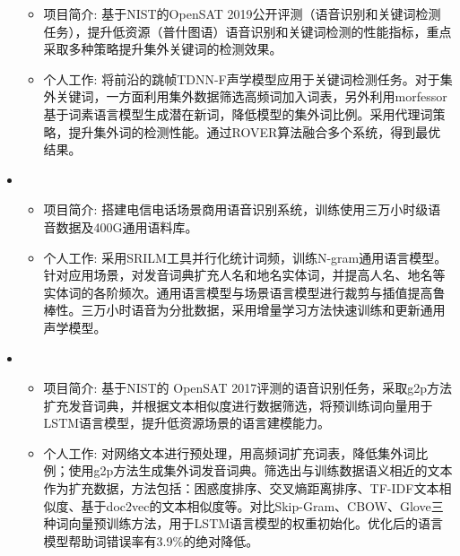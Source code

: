 \begin{itemize}[leftmargin=*]
{\begin{itemize}
        \item 项目简介: 基于NIST的OpenSAT 2019公开评测（语音识别和关键词检测任务），提升低资源（普什图语）语音识别和关键词检测的性能指标，重点采取多种策略提升集外关键词的检测效果。
        \item 个人工作:
        将前沿的跳帧TDNN-F声学模型应用于关键词检测任务。对于集外关键词，一方面利用集外数据筛选高频词加入词表，另外利用morfessor基于词素语言模型生成潜在新词，降低模型的集外词比例。采用代理词策略，提升集外词的检测性能。通过ROVER算法融合多个系统，得到最优结果。
      \end{itemize}
      }
    \item {}
     {\small
      \begin{itemize}
        \item 项目简介: 搭建电信电话场景商用语音识别系统，训练使用三万小时级语音数据及400G通用语料库。
        \item 个人工作:
        采用SRILM工具并行化统计词频，训练N-gram通用语言模型。针对应用场景，对发音词典扩充人名和地名实体词，并提高人名、地名等实体词的各阶频次。通用语言模型与场景语言模型进行裁剪与插值提高鲁棒性。三万小时语音为分批数据，采用增量学习方法快速训练和更新通用声学模型。
      \end{itemize}
      }
    \item {}
      {\small
      \begin{itemize}
        \item 项目简介: 基于NIST的 OpenSAT 2017评测的语音识别任务，采取g2p方法扩充发音词典，并根据文本相似度进行数据筛选，将预训练词向量用于LSTM语言模型，提升低资源场景的语言建模能力。
        \item 个人工作: 对网络文本进行预处理，用高频词扩充词表，降低集外词比例；使用g2p方法生成集外词发音词典。筛选出与训练数据语义相近的文本作为扩充数据，方法包括：困惑度排序、交叉熵距离排序、TF-IDF文本相似度、基于doc2vec的文本相似度等。对比Skip-Gram、CBOW、Glove三种词向量预训练方法，用于LSTM语言模型的权重初始化。优化后的语言模型帮助词错误率有3.9\%的绝对降低。
      \end{itemize}
      }
   \end{itemize}